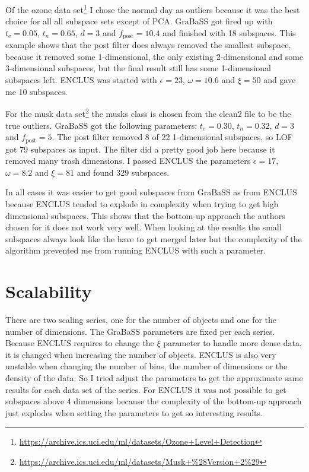 Of the ozone data set\footnote{\url{https://archive.ics.uci.edu/ml/datasets/Ozone+Level+Detection}} I chose the normal day as outliers because it was the best choice for all all subspace sets except of PCA. GraBaSS got fired up with $t_e = 0.05$, $t_n = 0.65$, $d = 3$ and $f_\mathrm{post} = 10.4$ and finished with \num{18} subspaces. This example shows that the post filter does always removed the smallest subspace, because it removed some 1-dimensional, the only existing 2-dimensional and some 3-dimensional subspaces, but the final result still has some 1-dimensional subspaces left. ENCLUS was started with $\epsilon = 23$, $\omega = 10.6$ and $\xi = 50$ and gave me \num{10} subspaces.

For the musk data set\footnote{\url{https://archive.ics.uci.edu/ml/datasets/Musk+\%28Version+2\%29}} the musks class is chosen from the clean2 file to be the true outliers. GraBaSS got the following parameters: $t_e = 0.30$, $t_n = 0.32$, $d = 3$ and $f_\mathrm{post} = 5$. The post filter removed \num{8} of \num{22} 1-dimensional subspaces, so LOF got \num{79} subspaces as input. The filter did a pretty good job here because it removed many trash dimensions. I passed ENCLUS the parameters $\epsilon = 17$, $\omega = 8.2$ and $\xi = 81$ and found \num{329} subspaces.

In all cases it was easier to get good subspaces from GraBaSS as from ENCLUS because ENCLUS tended to explode in complexity when trying to get high dimensional subspaces. This shows that the bottom-up approach the authors chosen for it does not work very well. When looking at the results the small subspaces always look like the have to get merged later but the complexity of the algorithm prevented me from running ENCLUS with such a parameter.

\section{Scalability}\label{sec:time}
There are two scaling series, one for the number of objects and one for the number of dimensions. The GraBaSS parameters are fixed per each series. Because ENCLUS requires to change the $\xi$ parameter to handle more dense data, it is changed when increasing the number of objects. ENCLUS is also very unstable when changing the number of bins, the number of dimensions or the density of the data. So I tried adjust the parameters to get the approximate same results for each data set of the series. For ENCLUS it was not possible to get subspaces above \num{4} dimensions because the complexity of the bottom-up approach just explodes when setting the parameters to get so interesting results.

